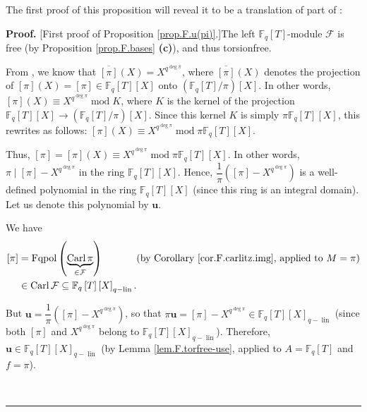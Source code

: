 \documentclass[numbers=enddot,12pt,final,onecolumn,notitlepage]{scrartcl}%
\theoremstyle{definition}
\newenvironment{proof}[1][Proof]{\noindent\textbf{#1.} }{\ \rule{0.5em}{0.5em}}
\begin{document}
The first proof of this proposition will reveal it to be a translation of part
of \cite[Theorem 2.11]{kc-carlitz}:

\begin{proof}
[First proof of Proposition \ref{prop.F.u(pi)}.]The left $\mathbb{F}%
_{q}\left[  T\right]  $-module $\mathcal{F}$ is free (by Proposition
\ref{prop.F.bases} \textbf{(c)}), and thus torsionfree.

From \cite[Theorem 2.11]{kc-carlitz}, we know that $\overline{\left[
\pi\right]  }\left(  X\right)  =X^{q^{\deg\pi}}$, where $\overline{\left[
\pi\right]  }\left(  X\right)  $ denotes the projection of $\left[
\pi\right]  \left(  X\right)  =\left[  \pi\right]  \in\mathbb{F}_{q}\left[
T\right]  \left[  X\right]  $ onto $\left(  \mathbb{F}_{q}\left[  T\right]
/\pi\right)  \left[  X\right]  $. In other words, $\left[  \pi\right]  \left(
X\right)  \equiv X^{q^{\deg\pi}}\operatorname{mod}K$, where $K$ is the kernel
of the projection $\mathbb{F}_{q}\left[  T\right]  \left[  X\right]
\rightarrow\left(  \mathbb{F}_{q}\left[  T\right]  /\pi\right)  \left[
X\right]  $. Since this kernel $K$ is simply $\pi\mathbb{F}_{q}\left[
T\right]  \left[  X\right]  $, this rewrites as follows: $\left[  \pi\right]
\left(  X\right)  \equiv X^{q^{\deg\pi}}\operatorname{mod}\pi\mathbb{F}%
_{q}\left[  T\right]  \left[  X\right]  $.

Thus, $\left[  \pi\right]  =\left[  \pi\right]  \left(  X\right)  \equiv
X^{q^{\deg\pi}}\operatorname{mod}\pi\mathbb{F}_{q}\left[  T\right]  \left[
X\right]  $. In other words, $\pi\mid\left[  \pi\right]  -X^{q^{\deg\pi}}$ in
the ring $\mathbb{F}_{q}\left[  T\right]  \left[  X\right]  $. Hence,
$\dfrac{1}{\pi}\left(  \left[  \pi\right]  -X^{q^{\deg\pi}}\right)  $ is a
well-defined polynomial in the ring $\mathbb{F}_{q}\left[  T\right]  \left[
X\right]  $ (since this ring is an integral domain). Let us denote this
polynomial by $\mathbf{u}$.

We have%
\begin{align*}
\left[  \pi\right]   &  =\operatorname*{Fqpol}\left(
\underbrace{\operatorname*{Carl}\pi}_{\in\mathcal{F}}\right)
\ \ \ \ \ \ \ \ \ \ \left(  \text{by Corollary \ref{cor.F.carlitz.img},
applied to }M=\pi\right) \\
&  \in\operatorname*{Carl}\mathcal{F}\subseteq\mathbb{F}_{q}\left[  T\right]
\left[  X\right]  _{q-\operatorname*{lin}}.
\end{align*}


But $\mathbf{u}=\dfrac{1}{\pi}\left(  \left[  \pi\right]  -X^{q^{\deg\pi}%
}\right)  $, so that $\pi\mathbf{u}=\left[  \pi\right]  -X^{q^{\deg\pi}}%
\in\mathbb{F}_{q}\left[  T\right]  \left[  X\right]  _{q-\operatorname*{lin}}$
(since both $\left[  \pi\right]  $ and $X^{q^{\deg\pi}}$ belong to
$\mathbb{F}_{q}\left[  T\right]  \left[  X\right]  _{q-\operatorname*{lin}}$).
Therefore, $\mathbf{u}\in\mathbb{F}_{q}\left[  T\right]  \left[  X\right]
_{q-\operatorname*{lin}}$ (by Lemma \ref{lem.F.torfree-use}, applied to
$A=\mathbb{F}_{q}\left[  T\right]  $ and $f=\pi$).


\end{proof}
\end{document}
